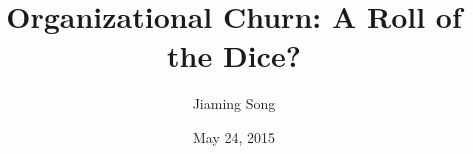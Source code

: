 \documentclass{beamer}
\title[Organizational Churn: A Roll of the Dice?]{Organizational Churn: A Roll of the Dice?} %
\author{Jiaming Song} %
\institute[Tsinghua University] %
{
Tsinghua University \\ %
\medskip
\textit{jiaming.tsong@gmail.com} %
}
\date{May 24, 2015} %
\begin{document}
\begin{frame}
\titlepage %
\end{frame}

\end{document}
